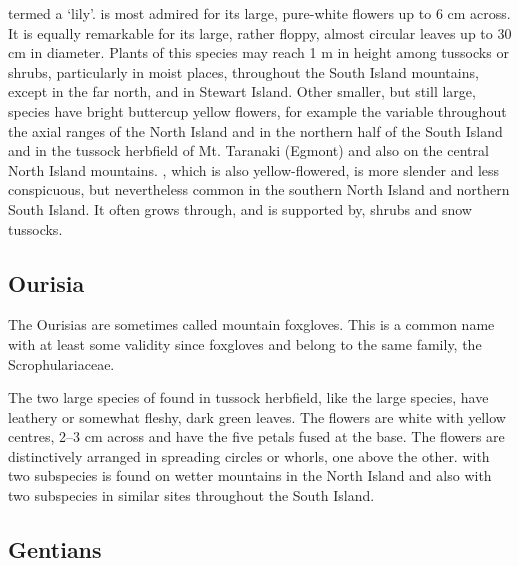 termed a `lily'.  is most admired for its large, pure-white flowers up to 6 cm across.
It is equally remarkable for its large, rather floppy, almost circular leaves up to 30 cm in diameter.
Plants of this species may reach 1 m in height among tussocks or shrubs, particularly in moist places, throughout the South Island mountains, except in the far north, and in Stewart Island.
Other smaller, but still large, species have bright buttercup yellow flowers, for example the variable  throughout the axial ranges of the North Island and in the northern half of the South Island and  in the tussock herbfield of Mt.
Taranaki (Egmont) and also on the central North Island mountains. , which is also yellow-flowered, is more slender and less conspicuous, but nevertheless common in the southern North Island and northern South Island.
It often grows through, and is supported by, shrubs and snow tussocks.

\subsection{Ourisia}

The Ourisias are sometimes called mountain foxgloves.
This is a common name with at least some validity since foxgloves and  belong to the same family, the Scrophulariaceae.

The two large species of  found in tussock herbfield, like the large  species, have leathery or somewhat fleshy, dark green leaves.
The flowers are white with yellow centres, 2--3 cm across and have the five petals fused at the base.
The flowers are distinctively arranged in spreading circles or whorls, one above the other.  with two subspecies is found on wetter mountains in the North Island and  also with two subspecies in similar sites throughout the South Island.

\subsection{Gentians}


